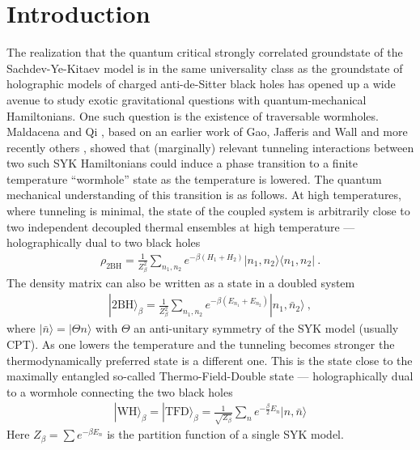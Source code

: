 \section{Introduction}
\label{sec:introduction}

\noindent
The realization that the quantum critical strongly correlated groundstate of the Sachdev-Ye-Kitaev model 
is in the same universality class as the groundstate of holographic models of charged anti-de-Sitter black holes has opened up a wide avenue to study exotic gravitational questions with quantum-mechanical Hamiltonians. One such question is the existence of traversable wormholes. Maldacena and Qi \cite{maldacena2018eternal}, based on an earlier work of Gao, Jafferis and Wall \cite{gaoTraversableWormholesDouble2017} and more recently others \cite{maldacenaDivingTraversableWormholes2017,maldacenaTraversableWormholesFour2020,bakBulkViewTeleportation2018,gaoRegenesisQuantumTraversable2019,fuTraversableAsymptoticallyFlat2019,bakExperimentalProbesTraversable2019,qiCoupledSYKModel2020a,caceres2021sparse,haenel2021traversable,berenguer2024floquet},
showed that (marginally) relevant tunneling interactions between two such SYK Hamiltonians could induce a phase transition to a finite temperature ``wormhole'' state as the temperature is lowered. The quantum mechanical understanding of this transition is as follows. At high temperatures, where tunneling is minimal, the state of the coupled system is arbitrarily close to two independent decoupled thermal ensembles at high temperature --- holographically dual to two black holes
\begin{align}
\label{eq:2BH-densitymatrix}
    \rho_{\text{2BH}} = \frac{1}{Z_{\beta}^2}\sum_{n_1,n_2} e^{-\beta (H_1+H_2)} |n_1,n_2\rangle\langle n_1,n_2|~.
\end{align}
The density matrix can also be written as a state in a doubled system
\begin{align}
\label{eq:2BH-state}
|\text{2BH}\rangle_{\beta} = \frac{1}{Z_{\beta}^2}\sum_{n_1,n_2} e^{-\beta (E_{n_1}+E_{n_2})} |n_1,\bar{n}_2\rangle~,
\end{align}
where $|\bar{n}\rangle = |\Theta n\rangle$ with $\Theta$ an anti-unitary symmetry of the SYK model (usually CPT).
As one lowers the temperature and the tunneling becomes stronger the thermodynamically preferred state is a different one. This is the state close to the maximally entangled so-called Thermo-Field-Double state --- holographically dual to a wormhole connecting the two black holes
\begin{align}
\label{eq:WH-state}
    |\text{WH}\rangle_{\beta} =|\text{TFD}\rangle_{\beta} = \frac{1}{\sqrt{Z_{\beta}}}\sum_n e^{-\frac{\beta}{2}E_{n}} |n,\bar{n}\rangle
\end{align}
Here $Z_{\beta}=\sum e^{-\beta E_n}$ is the partition function of a single SYK model.


